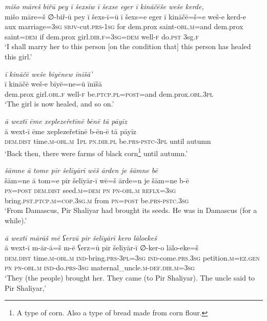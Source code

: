 \ea \label{ZP.90}
\textit{mišo māreš biřū pey ī šexsīw ī šexse eger ī kināčēše weše kerde,} \\ 
\gll mišo māre=š ∅-biř-ū pey ī šexs-ī=ū ī šexs=e eger ī kināčē=š=e weš-e kerd-e \\ 
 aux marriage\textsc{=3sg} \textsc{sbjv-}cut\textsc{.prs}\textsc{-\textsc{1sg}} for dem.prox saint\textsc{-obl}\textsc{.m}=and dem.prox saint\textsc{=dem} if dem.prox girl\textsc{.dir}\textsc{.f}\textsc{=3sg}\textsc{=dem} well\textsc{-f} do\textsc{.pst} 3sg\textsc{.f} \\ 
\glt `I shall marry her to this person [on the condition that] this person has healed this girl.'
\z 
 
\ea \label{ZP.91}
\textit{ī kināčē weše bīyēnew īnīšā’} \\ 
\gll ī kināčē weš-e bīyē=ne=ū īnīšā \\ 
 dem.prox girl\textsc{.obl}\textsc{.f} well\textsc{-f} be\textsc{.ptcp}\textsc{.pl}\textsc{=\textsc{post}}=and dem.prox\textsc{.obl}\textsc{.3pl} \\ 
\glt `The girl is now healed, and so on.'
\z 
 
\ea \label{ZP.94}
\textit{ā wextī ēme xeplezeřetīnē bēnē tā pāyīz} \\ 
\gll ā wext-ī ēme xeplezeřetīnē b-ēn-ē tā pāyīz \\ 
 \textsc{dem.dist} time\textsc{.m}\textsc{-obl}\textsc{.m} \textsc{1pl} \textsc{pn}\textsc{.dir}\textsc{.pl} be\textsc{.prs}\textsc{-pstc}\textsc{-3pl} until autumn \\ 
\glt `Back then, there were farms of black corn\footnote{A type of corn. Also a type of bread made from corn flour.} until autumn.'
\z 
 
\ea \label{ZP.95}
\textit{šāmne ā tome pīr šelīyārī wēš ārden je šāmne bē} \\ 
\gll šām=ne ā tom=e pīr šelīyār-ī wē=š ārde=n je šām=ne b-ē \\ 
 \textsc{pn}\textsc{=\textsc{post}} \textsc{dem.dist} seed\textsc{.m}\textsc{=dem} \textsc{pn} \textsc{pn}\textsc{-obl}\textsc{.m} \textsc{reflx}\textsc{=3sg} bring\textsc{.pst}\textsc{.ptcp}\textsc{.m}\textsc{=cop}\textsc{.3sg}\textsc{.m} from \textsc{pn}\textsc{=\textsc{post}} be\textsc{.prs}\textsc{-pstc}\textsc{.3sg} \\ 
\glt `From Damascus, Pir Shaliyar had brought its seeds. He was in Damascus (for a while).'
\z 
 
\ea \label{ZP.97}
\textit{ā wextī mārāš mē ʕerzū pīr šelīyārī kero lāloekeš} \\ 
\gll ā wext-ī m-ār-ā=š m-ē ʕerz=ū pīr šelīyār-ī ∅-ker-o lālo-eke=š \\ 
 \textsc{dem.dist} time\textsc{.m}\textsc{-obl}\textsc{.m} \textsc{ind-}bring\textsc{.prs}\textsc{-3pl}\textsc{=3sg} \textsc{ind-}come\textsc{.prs}\textsc{.3sg} petition\textsc{.m}\textsc{\textsc{=ez.gen}} \textsc{pn} \textsc{pn}\textsc{-obl}\textsc{.m} \textsc{ind-}do\textsc{.prs}\textsc{-3sg} maternal\_uncle\textsc{.m}\textsc{-def}\textsc{.dir}\textsc{.m}\textsc{=3sg} \\ 
\glt `They (the people) brought her. They came (to Pir Shaliyar). The uncle said to Pir Shaliyar,'
\z 
 
